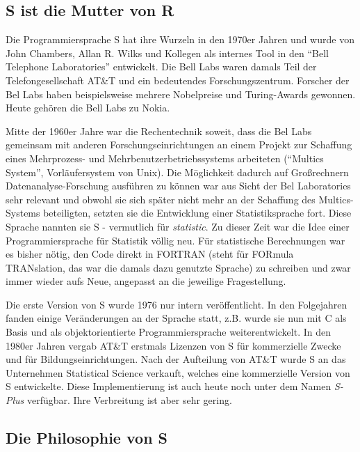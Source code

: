 \documentclass[
]{book}
\begin{document}
\hypertarget{s-ist-die-mutter-von-r}{%
\subsection{S ist die Mutter von R}\label{s-ist-die-mutter-von-r}}

Die Programmiersprache S hat ihre Wurzeln in den 1970er Jahren und wurde von John Chambers,
Allan R. Wilks und Kollegen als internes Tool in den ``Bell Telephone Laboratories'' entwickelt.
Die Bell Labs waren damals Teil der Telefongesellschaft AT\&T und ein bedeutendes Forschungszentrum.
Forscher der Bel Labs haben beispielsweise mehrere Nobelpreise und Turing-Awards gewonnen.
Heute gehören die Bell Labs zu Nokia.

Mitte der 1960er Jahre war die Rechentechnik soweit, dass die Bel Labs gemeinsam mit anderen
Forschungseinrichtungen an einem Projekt zur Schaffung eines Mehrprozess- und Mehrbenutzerbetriebssystems arbeiteten (``Multics System'', Vorläufersystem von Unix).
Die Möglichkeit dadurch auf Großrechnern Datenanalyse-Forschung ausführen zu können war aus Sicht der Bel Laboratories sehr relevant und obwohl sie sich später nicht mehr an der Schaffung des Multics-Systems beteiligten, setzten sie die Entwicklung einer Statistiksprache fort. Diese Sprache nannten sie S - vermutlich für \emph{statistic}.
Zu dieser Zeit war die Idee einer Programmiersprache für Statistik völlig neu.
Für statistische Berechnungen war es bisher nötig, den Code direkt in FORTRAN (steht für FORmula TRANslation, das war die damals dazu genutzte Sprache) zu schreiben und zwar immer wieder aufs Neue, angepasst an die jeweilige Fragestellung.

Die erste Version von S wurde 1976 nur intern veröffentlicht. In den Folgejahren fanden einige
Veränderungen an der Sprache statt, z.B. wurde sie nun mit C als Basis und als objektorientierte
Programmiersprache weiterentwickelt. In den 1980er Jahren vergab AT\&T erstmals Lizenzen von S für
kommerzielle Zwecke und für Bildungseinrichtungen.
Nach der Aufteilung von AT\&T wurde S an das Unternehmen Statistical Science verkauft, welches eine kommerzielle Version von S entwickelte.
Diese Implementierung ist auch heute noch unter dem Namen \emph{S-Plus} verfügbar.
Ihre Verbreitung ist aber sehr gering.

\hypertarget{die-philosophie-von-s}{%
\subsection{Die Philosophie von S}\label{die-philosophie-von-s}}
\end{document}
